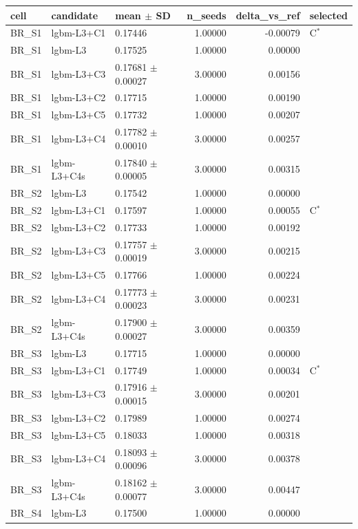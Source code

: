 \begin{tabular}{lllrrl}
\toprule
cell & candidate & mean $\pm$ SD & n\_seeds & delta\_vs\_ref & selected \\
\midrule
BR\_S1 & lgbm-L3+C1 & 0.17446 & 1.00000 & -0.00079 & C$^{*}$ \\
BR\_S1 & lgbm-L3 & 0.17525 & 1.00000 & 0.00000 &  \\
BR\_S1 & lgbm-L3+C3 & 0.17681 $\pm$ 0.00027 & 3.00000 & 0.00156 &  \\
BR\_S1 & lgbm-L3+C2 & 0.17715 & 1.00000 & 0.00190 &  \\
BR\_S1 & lgbm-L3+C5 & 0.17732 & 1.00000 & 0.00207 &  \\
BR\_S1 & lgbm-L3+C4 & 0.17782 $\pm$ 0.00010 & 3.00000 & 0.00257 &  \\
BR\_S1 & lgbm-L3+C4s & 0.17840 $\pm$ 0.00005 & 3.00000 & 0.00315 &  \\
BR\_S2 & lgbm-L3 & 0.17542 & 1.00000 & 0.00000 &  \\
BR\_S2 & lgbm-L3+C1 & 0.17597 & 1.00000 & 0.00055 & C$^{*}$ \\
BR\_S2 & lgbm-L3+C2 & 0.17733 & 1.00000 & 0.00192 &  \\
BR\_S2 & lgbm-L3+C3 & 0.17757 $\pm$ 0.00019 & 3.00000 & 0.00215 &  \\
BR\_S2 & lgbm-L3+C5 & 0.17766 & 1.00000 & 0.00224 &  \\
BR\_S2 & lgbm-L3+C4 & 0.17773 $\pm$ 0.00023 & 3.00000 & 0.00231 &  \\
BR\_S2 & lgbm-L3+C4s & 0.17900 $\pm$ 0.00027 & 3.00000 & 0.00359 &  \\
BR\_S3 & lgbm-L3 & 0.17715 & 1.00000 & 0.00000 &  \\
BR\_S3 & lgbm-L3+C1 & 0.17749 & 1.00000 & 0.00034 & C$^{*}$ \\
BR\_S3 & lgbm-L3+C3 & 0.17916 $\pm$ 0.00015 & 3.00000 & 0.00201 &  \\
BR\_S3 & lgbm-L3+C2 & 0.17989 & 1.00000 & 0.00274 &  \\
BR\_S3 & lgbm-L3+C5 & 0.18033 & 1.00000 & 0.00318 &  \\
BR\_S3 & lgbm-L3+C4 & 0.18093 $\pm$ 0.00096 & 3.00000 & 0.00378 &  \\
BR\_S3 & lgbm-L3+C4s & 0.18162 $\pm$ 0.00077 & 3.00000 & 0.00447 &  \\
BR\_S4 & lgbm-L3 & 0.17500 & 1.00000 & 0.00000 &  \\

\end{tabular}
